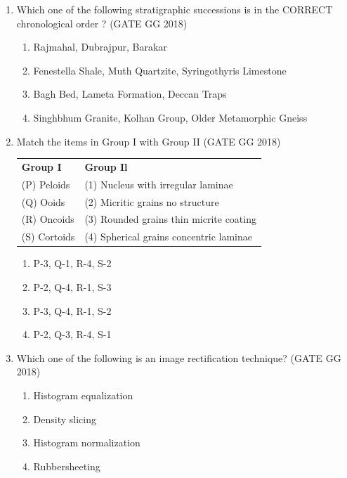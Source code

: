 \documentclass[journal]{IEEEtran}
\begin{document}
\begin{enumerate}[start=1]
\item Which one of the following stratigraphic successions is in the CORRECT chronological order ?  
\hspace*{15.7cm}(GATE GG 2018)
\begin{enumerate}
\item Rajmahal, Dubrajpur, Barakar
\item Fenestella Shale, Muth Quartzite, Syringothyris Limestone
\item Bagh Bed, Lameta Formation, Deccan Traps
\item Singhbhum Granite, Kolhan Group, Older Metamorphic Gneiss
\end{enumerate}

\item  Match the items in Group I with Group II
\hfill(GATE GG 2018)\\
\begin{tabular}{ l l }
\textbf{Group I} & \textbf{Group Il}\\
(P) Peloids &  (1) Nucleus with irregular laminae\\
 (Q) Ooids &  (2) Micritic grains no structure\\
  (R) Oncoids & (3) Rounded grains thin micrite coating\\
  (S) Cortoids & (4) Spherical grains concentric laminae 
\end{tabular}
\begin{multicols}{2}
\begin{enumerate}
\item P-3, Q-1, R-4, S-2
\item P-2, Q-4, R-1, S-3
\item P-3, Q-4, R-1, S-2
\item P-2, Q-3, R-4, S-1
\end{enumerate}
\end{multicols}

\item Which one of the following is an image rectification technique?  
\hfill(GATE GG 2018)
\begin{enumerate}
\item Histogram equalization
\item Density slicing
\item Histogram normalization
\item Rubbersheeting
\end{enumerate}


\end{enumerate}
\end{document}
